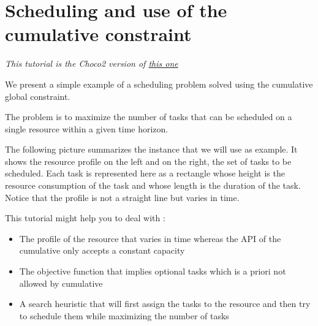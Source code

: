 
\section{Scheduling and use of the cumulative constraint}\label{schedulinganduseofthecumulative:schedulinganduseofthecumulativeconstraint}\hypertarget{schedulinganduseofthecumulative:schedulinganduseofthecumulativeconstraint}{}

\emph{This tutorial is the Choco2 version of \href{http://choco-solver.net/index.phptitle=schedulinganduseofthecumulative}{this one}}

We present a simple example of a scheduling problem solved using the cumulative global constraint.

The problem is to maximize the number of tasks that can be scheduled on  a single resource within a given time horizon.

The following picture summarizes the instance that we will use as example. 
It shows the resource profile on the left and on the right, the set of tasks to be scheduled. Each task is represented here as a rectangle whose height is the resource consumption of the task and whose length is the duration of the task. Notice that the profile is not a straight line but varies in time. 


This tutorial might help you to deal with :

\begin{itemize}
	\item The profile of the resource that varies in time whereas the API of the cumulative only accepts a constant capacity
	\item The objective function that implies optional tasks which is a priori not allowed by cumulative
	\item A search heuristic that will first assign the tasks to the resource and then try to schedule them while maximizing the number of tasks
\end{itemize}


